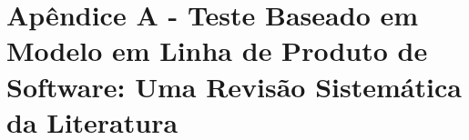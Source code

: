\chapter{Apêndice A - Teste Baseado em Modelo em Linha de Produto de Software: Uma Revisão Sistemática da Literatura}
\label{sec:apendice}

